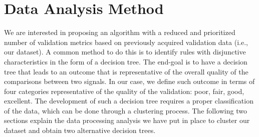 
\section{Data Analysis Method} 
\label{sec:approach}

We are interested in proposing an algorithm with a reduced and prioritized number of validation metrics based on previously acquired validation data (i.e., our dataset). A common method to do this is to identify rules with disjunctive characteristics in the form of a decision tree. The end-goal is to have a decision tree that leads to an outcome that is representative of the overall quality of the comparisons between two signals. In our case, we define such outcome in terms of four categories representative of the quality of the validation: poor, fair, good, excellent. The development of such a decision tree requires a proper classification of the data, which can be done through a clustering process. The following two sections explain the data processing analysis we have put in place to cluster our dataset and obtain two alternative decision trees.




